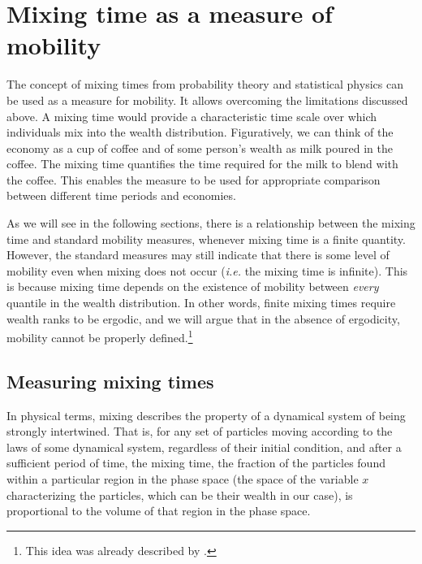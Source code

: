 \documentclass[11pt]{article}
\newcommand{\ie}{{\it i.e.}\xspace}
\numberwithin{equation}{section}
\begin{document}
\FloatBarrier

\section{Mixing time as a measure of mobility}


The concept of mixing times from probability theory and statistical physics can be used as a measure for mobility. It allows overcoming the limitations discussed above. A mixing time would provide a characteristic time scale over which individuals mix into the wealth distribution. Figuratively, we can think of the economy as a cup of coffee and of some person's wealth as milk poured in the coffee. The mixing time quantifies the time required for the milk to blend with the coffee. This enables the measure to be used for appropriate comparison between different time periods and economies.

As we will see in the following sections, there is a relationship between the mixing time and standard mobility measures, whenever mixing time is a finite quantity. However, the standard measures may still indicate that there is some level of mobility even when mixing does not occur (\ie the mixing time is infinite). This is because mixing time depends on the existence of mobility between \textit{every} quantile in the wealth distribution. In other words, finite mixing times require wealth ranks to be ergodic, and we will argue that in the absence of ergodicity, mobility cannot be properly defined.\footnote{This idea was already described by \citet{Mcfarland1970}.}

\subsection{Measuring mixing times}

In physical terms, mixing describes the property of a dynamical system of being strongly intertwined. That is, for any set of particles moving according to the laws of some dynamical system, regardless of their initial condition, and after a sufficient period of time, the mixing time, the fraction of the particles found within a particular region in the phase space (the space of the variable $x$ characterizing the particles, which can be their wealth in our case), is proportional to the volume of that region in the phase space.
\end{document}
